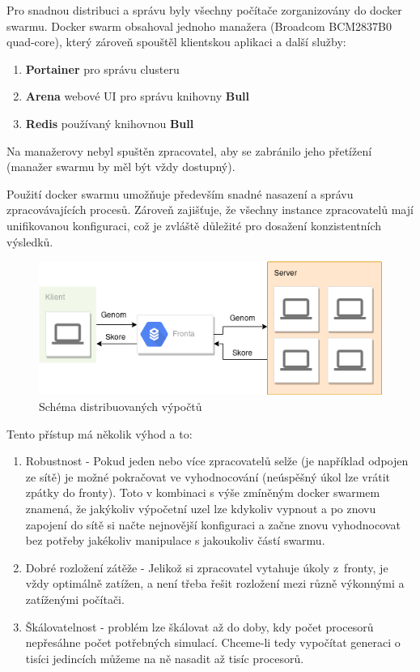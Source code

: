 Pro snadnou distribuci a správu byly všechny počítače zorganizovány do docker swarmu. Docker swarm obsahoval jednoho manažera (Broadcom BCM2837B0 quad-core), který zároveň spouštěl klientskou aplikaci a další služby:

\begin{enumerate}
	\item \textbf{Portainer} pro správu clusteru
	\item \textbf{Arena} webové UI pro správu knihovny \textbf{Bull}
	\item \textbf{Redis} používaný knihovnou \textbf{Bull}
\end{enumerate}

Na manažerovy nebyl spuštěn zpracovatel, aby se zabránilo jeho přetížení (manažer swarmu by měl být vždy dostupný).

Použití docker swarmu umožňuje především snadné nasazení a správu zpracovávajících procesů. Zároveň zajišťuje, že všechny instance zpracovatelů mají unifikovanou konfiguraci, což je zvláště důležité pro dosažení konzistentních výsledků.

\begin{figure}[H]
	\centering
	\includegraphics[scale=0.5]{distributed}
	\caption[Schéma distribuovaných výpočtů]{Schéma distribuovaných výpočtů}
	\label{fig:distributed}
\end{figure}

Tento přístup má několik výhod a to:

\begin{enumerate}
	\item Robustnost - Pokud jeden nebo více zpracovatelů selže (je například odpojen ze sítě) je možné pokračovat ve vyhodnocování (neúspěšný úkol lze vrátit zpátky do fronty). Toto v kombinaci s výše zmíněným docker swarmem znamená, že jakýkoliv výpočetní uzel lze kdykoliv vypnout a po znovu zapojení do sítě si načte nejnovější konfiguraci a začne znovu vyhodnocovat bez potřeby jakékoliv manipulace s jakoukoliv částí swarmu.
	\item Dobré rozložení zátěže - Jelikož si zpracovatel vytahuje úkoly z~fronty, je vždy optimálně zatížen, a není třeba řešit rozložení mezi různě výkonnými a zatíženými počítači.
	\item Škálovatelnost - problém lze škálovat až do doby, kdy počet procesorů nepřesáhne počet potřebných simulací. Chceme-li tedy vypočítat generaci o tisíci jedincích můžeme na ně nasadit až tisíc procesorů.
\end{enumerate}

